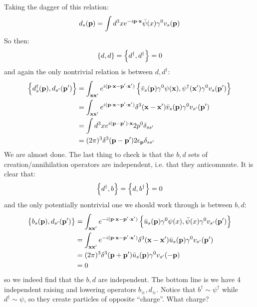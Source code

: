 Taking the dagger of this relation:
\begin{equation}
    d_s(\mathbf{p}) = \int d^3x e^{-i\mathbf{p}\cdot\mathbf{x}}\bar{\psi}(x)\gamma^0 v_s(\mathbf{p})
\end{equation}
So then:
\begin{equation}
    \set{d, d} = \set{d^\dagger, d^\dagger} = 0
\end{equation}
and again the only nontrivial relation is between $d, d^\dag$:
\begin{equation}
    \begin{split}
        \set{d_s^\dagger(\ensuremath{\mathbf{p}}), d_{s'}(\ensuremath{\mathbf{p}}')} &= \int_{\mathbf{x}\mathbf{x}'}e^{i(\mathbf{p} \cdot \mathbf{x} - \mathbf{p}'\cdot\mathbf{x}')}\set{\bar{v}_s(\ensuremath{\mathbf{p}})\gamma^0\psi(\ensuremath{\mathbf{x}}), \psi^\dagger(\ensuremath{\mathbf{x}}')\gamma^0v_s(\ensuremath{\mathbf{p}}')}
        \\ &= \int_{\mathbf{x}\mathbf{x}'}e^{i(\mathbf{p} \cdot \mathbf{x} - \mathbf{p}'\cdot\mathbf{x}')} \delta^3(\mathbf{x}-\mathbf{x}')\bar{v}_s(\mathbf{p})\gamma^0v_{s'}(\mathbf{p}')
        \\ &= \int d^3x e^{i(\mathbf{p} - \mathbf{p}')\cdot\mathbf{x}} 2p^0\delta_{ss'}
        \\ &= (2\pi)^3\delta^3(\mathbf{p} - \mathbf{p}')2\epsilon_{\mathbf{p}}\delta_{ss'}
    \end{split}
\end{equation}
We are almost done. The last thing to check is that the $b, d$ sets of creation/annihilation operators are independent, i.e. that they anticommute. It is clear that:
\begin{equation}
    \set{d^\dagger, b} = \set{d, b^\dagger} = 0
\end{equation}
and the only potentially nontrivial one we should work through is between $b, d$:
\begin{equation}
    \begin{split}
        \set{b_s(\ensuremath{\mathbf{p}}), d_{s'}(\ensuremath{\mathbf{p}}')} &= \int_{\mathbf{x}\mathbf{x}'}e^{-i(\mathbf{p}\cdot\mathbf{x} - \mathbf{p}'\cdot\mathbf{x}')}\set{\bar{u}_s(\ensuremath{\mathbf{p}})\gamma^0\psi(x), \bar{\psi}(x)\gamma^0v_{s'}(\ensuremath{\mathbf{p}}')}
        \\ &= \int_{\mathbf{x}\mathbf{x}'}e^{-i(\mathbf{p}\cdot\mathbf{x} - \mathbf{p}'\cdot\mathbf{x}')}\delta^3(\mathbf{x}-\mathbf{x}')\bar{u}_s(\mathbf{p})\gamma^0v_{s'}(\mathbf{p}')
        \\ &= (2\pi)^3\delta^3(\mathbf{p} + \mathbf{p}')\bar{u}_s(\mathbf{p})\gamma^0v_{s'}(-\mathbf{p})
        \\ &= 0
    \end{split}
\end{equation}
so we indeed find that the $b, d$ are independent. The bottom line is we have 4 independent raising and lowering operators $b_\pm, d_\pm$. Notice that $b^\dag \sim \psi^\dag$ while $d^\dag \sim \psi$, so they create particles of opposite ``charge''. What charge?
